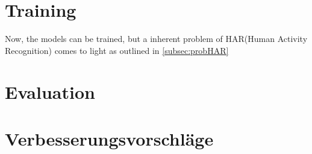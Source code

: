 \section{Training}\label{section:training}
Now, the models can be trained, but a inherent problem of HAR(Human Activity Recognition) comes to light as outlined in \ref{subsec:probHAR}
\section{Evaluation}\label{sec:evaluation}
\section{Verbesserungsvorschläge}
